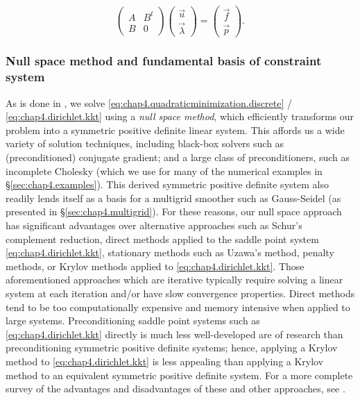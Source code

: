 \begin{equation} \label{eq:chap4.dirichlet.kkt}
\begin{pmatrix} A & B^t \\ B & 0 \end{pmatrix} \begin{pmatrix} \vec{u} \\ \vec{\lambda} \end{pmatrix} = \begin{pmatrix} \vec{f} \\ \vec{p} \end{pmatrix}.
\end{equation}

\subsubsection{Null space method and fundamental basis of constraint system} \label{subsubsec:chap4.nullspacemethod}

As is done in \cite{Bedrossian10}, we solve \eqref{eq:chap4.quadraticminimization.discrete} / \eqref{eq:chap4.dirichlet.kkt} using a \emph{null space method}, which efficiently transforms our problem into a symmetric positive definite linear system. This affords us a wide variety of solution techniques, including black-box solvers such as (preconditioned) conjugate gradient; and a large class of preconditioners, such as incomplete Cholesky (which we use for many of the numerical examples in \S\ref{sec:chap4.examples}). This derived symmetric positive definite system also readily lends itself as a basis for a multigrid smoother such as Gauss-Seidel (as presented in \S\ref{sec:chap4.multigrid}). For these reasons, our null space approach has significant advantages over alternative approaches such as Schur's complement reduction, direct methods applied to the saddle point system \eqref{eq:chap4.dirichlet.kkt}, stationary methods such as Uzawa's method, penalty methods, or Krylov methods applied to \eqref{eq:chap4.dirichlet.kkt}. Those aforementioned approaches which are iterative typically require solving a linear system at each iteration and/or have slow convergence properties. Direct methods tend to be too computationally expensive and memory intensive when applied to large systems. Preconditioning saddle point systems such as \eqref{eq:chap4.dirichlet.kkt} directly is much less well-developed are of research than preconditioning symmetric positive definite systems; hence, applying a Krylov method to \eqref{eq:chap4.dirichlet.kkt} is less appealing than applying a Krylov method to an equivalent symmetric positive definite system. For a more complete survey of the advantages and disadvantages of these and other approaches, see \cite{Benzi05}.

